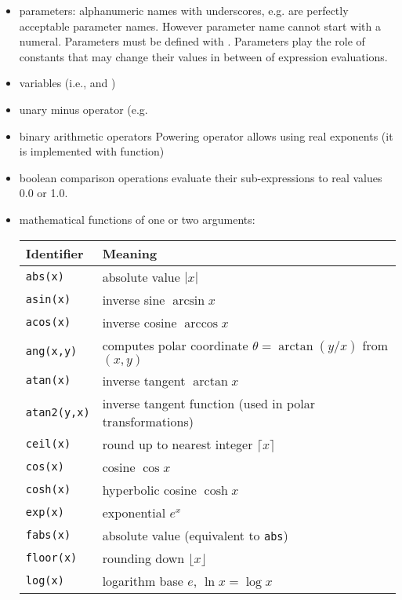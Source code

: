 \begin{itemize}
\item parameters: alphanumeric names with underscores, e.g.  are perfectly acceptable parameter names. However
parameter name cannot start with a numeral. Parameters must be defined with
. Parameters play the role of constants
that may change their values in between of expression evaluations.

\item variables (i.e.,  and )
\item unary minus operator (e.g. 
\item binary arithmetic operators \inltt{+, -, *, /, \^}
   Powering operator allows using real exponents (it is implemented with
    function)
\item boolean comparison operations \inlsh{<, <=, >, >=, ==} evaluate their
sub-expressions to real values 0.0 or 1.0.
\item mathematical functions of one or two arguments:
\begin{center}
\begin{tabular}{ll}
  \toprule
  \textbf{Identifier} & \textbf{Meaning} \\
  \midrule
  \texttt{abs(x)}     & absolute value $|x|$ \\
  \texttt{asin(x)}    & inverse sine $\arcsin x$ \\
  \texttt{acos(x)}    & inverse cosine $\arccos x$ \\
  \texttt{ang(x,y)}   & computes polar coordinate $\theta=\arctan(y/x)$ from $(x,y)$\\
  \texttt{atan(x)}    & inverse tangent $\arctan x$ \\
  \texttt{atan2(y,x)} & inverse tangent function (used in polar transformations) \\
  \texttt{ceil(x)}    & round up to nearest integer $\lceil x\rceil$ \\
  \texttt{cos(x)}     & cosine $\cos x$ \\
  \texttt{cosh(x)}    & hyperbolic cosine $\cosh x$ \\
  \texttt{exp(x)}     & exponential $e^x$ \\
  \texttt{fabs(x)}    & absolute value (equivalent to \texttt{abs}) \\
  \texttt{floor(x)}   & rounding down $\lfloor x\rfloor$ \\
  \texttt{log(x)}     & logarithm base $e$, $\ln x = \log x$ \\

\end{tabular}
\end{center}
\end{itemize}
